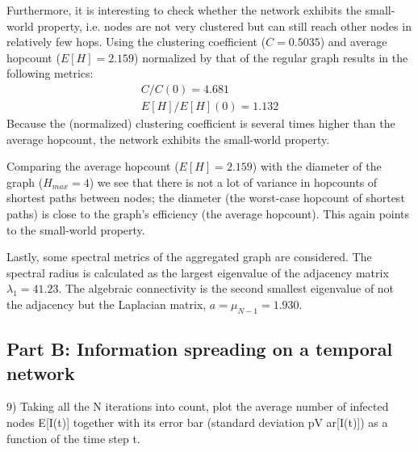 \documentclass[letterpaper]{article}
\begin{document}
Furthermore, it is interesting to check whether the network exhibits the small-world property, i.e. nodes are not very clustered but can still reach other nodes in relatively few hops. Using the clustering coefficient (\(C=0.5035\)) and average hopcount (\(E[H]=2.159\)) normalized by that of the regular graph results in the following metrics: 
\begin{align*}
C/C(0) = 4.681\\
E[H]/E[H](0) = 1.132
\end{align*}
Because the (normalized) clustering coefficient is several times higher than the average hopcount, the network exhibits the small-world property. 


Comparing the average hopcount (\(E[H]=2.159\)) with the diameter of the graph (\(H_{max}=4\)) we see that there is not a lot of variance in hopcounts of shortest paths between nodes; the diameter (the worst-case hopcount of shortest paths) is close to the graph's efficiency (the average hopcount). This again points to the small-world property.

Lastly, some spectral metrics of the aggregated graph are considered. The spectral radius is calculated as the largest eigenvalue of the adjacency matrix \(\lambda_1=41.23\). The algebraic connectivity is the second smallest eigenvalue of not the adjacency but the Laplacian matrix, \(a=\mu_{N-1}=1.930\). 


\subsection*{Part B: Information spreading on a temporal network}
9) Taking all the N iterations into count, plot the average number of infected nodes E[I(t)] together with
its error bar (standard deviation pV ar[I(t)]) as a function of the time step t.
\end{document}
